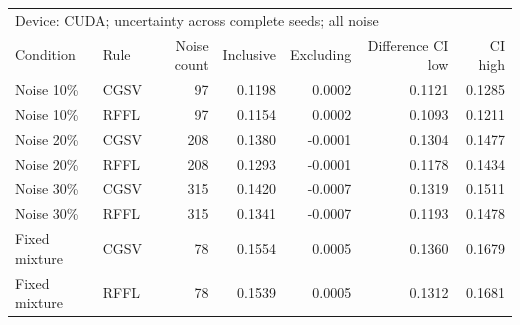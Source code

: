 \begin{tabular}{llrrrrr}
\toprule
\multicolumn{7}{l}{Device: CUDA; uncertainty across complete seeds; all noise} \\
Condition & Rule & Noise count & Inclusive & Excluding & Difference CI low & CI high \\
\midrule
Noise 10\% & CGSV & 97 & 0.1198 & 0.0002 & 0.1121 & 0.1285 \\
Noise 10\% & RFFL & 97 & 0.1154 & 0.0002 & 0.1093 & 0.1211 \\
Noise 20\% & CGSV & 208 & 0.1380 & -0.0001 & 0.1304 & 0.1477 \\
Noise 20\% & RFFL & 208 & 0.1293 & -0.0001 & 0.1178 & 0.1434 \\
Noise 30\% & CGSV & 315 & 0.1420 & -0.0007 & 0.1319 & 0.1511 \\
Noise 30\% & RFFL & 315 & 0.1341 & -0.0007 & 0.1193 & 0.1478 \\
Fixed mixture & CGSV & 78 & 0.1554 & 0.0005 & 0.1360 & 0.1679 \\
Fixed mixture & RFFL & 78 & 0.1539 & 0.0005 & 0.1312 & 0.1681 \\
\bottomrule
\end{tabular}
